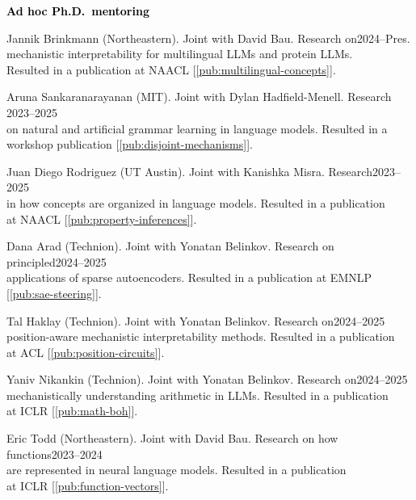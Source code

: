 \documentclass[10pt]{article}
\renewcommand{\subsection}[1]{\textcolor{black}{#1}}
\begin{document}
	\subsection{\textbf{Ad hoc Ph.D.\ mentoring}}
	\begin{innerlist}
	\item Jannik Brinkmann (Northeastern). Joint with David Bau. Research on\hfill 2024--Pres.\\
	      mechanistic interpretability for multilingual LLMs and protein LLMs.\\Resulted
		  in a publication at NAACL [\ref{pub:multilingual-concepts}].
	\item Aruna Sankaranarayanan (MIT). Joint with Dylan Hadfield-Menell. Research \hfill 2023--2025\\
	on natural and artificial grammar learning in language models. Resulted in a\\workshop publication [\ref{pub:disjoint-mechanisms}].
	\item Juan Diego Rodriguez (UT Austin). Joint with Kanishka Misra. Research\hfill 2023--2025\\
	in how concepts are organized in language models. Resulted in a publication\\at NAACL [\ref{pub:property-inferences}].
	\item Dana Arad (Technion). Joint with Yonatan Belinkov. Research on principled\hfill 2024--2025\\applications of sparse autoencoders.
	Resulted in a publication at EMNLP [\ref{pub:sae-steering}].
	\item Tal Haklay (Technion). Joint with Yonatan Belinkov. Research on\hfill 2024--2025\\position-aware mechanistic interpretability methods.
	      Resulted in a publication\\at ACL [\ref{pub:position-circuits}].
	\item Yaniv Nikankin (Technion). Joint with Yonatan Belinkov. Research on\hfill 2024--2025\\mechanistically understanding arithmetic in LLMs.
	      Resulted in a publication\\at ICLR [\ref{pub:math-boh}].
	\item Eric Todd (Northeastern). Joint with David Bau. Research on how functions\hfill 2023--2024\\are
		  represented in neural language models. Resulted in a publication\\at ICLR [\ref{pub:function-vectors}].
	\end{innerlist}
\end{document}
